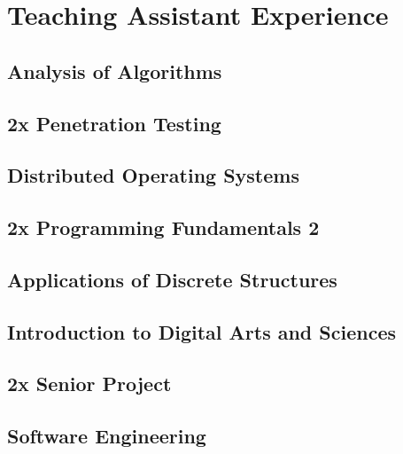 \documentclass[../resume.tex]{subfiles}
\begin{document}
\section{Teaching Assistant Experience}
\subsection{Analysis of Algorithms}
\subsection{2x Penetration Testing}
\subsection{Distributed Operating Systems}
\subsection{2x Programming Fundamentals 2}
\subsection{Applications of Discrete Structures}
\subsection{Introduction to Digital Arts and Sciences}
\subsection{2x Senior Project}
\subsection{Software Engineering}
\end{document}
